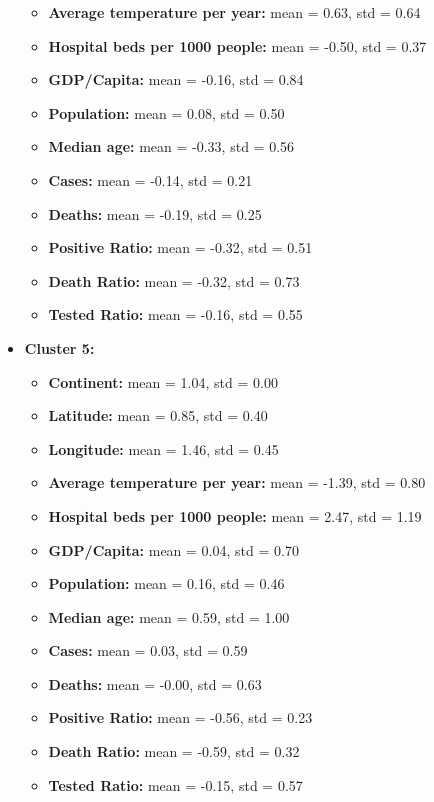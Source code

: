\documentclass[12pt,a4paper]{article}
\begin{document}
\begin{itemize}
\begin{itemize}
            \item \textbf{Average temperature per year:} mean = 0.63, std = 0.64
            \item \textbf{Hospital beds per 1000 people:} mean = -0.50, std = 0.37
            \item \textbf{GDP/Capita:} mean = -0.16, std = 0.84
            \item \textbf{Population:} mean = 0.08, std = 0.50
            \item \textbf{Median age:} mean = -0.33, std = 0.56
            \item \textbf{Cases:} mean = -0.14, std = 0.21
            \item \textbf{Deaths:} mean = -0.19, std = 0.25
            \item \textbf{Positive Ratio:} mean = -0.32, std = 0.51
            \item \textbf{Death Ratio:} mean = -0.32, std = 0.73
            \item \textbf{Tested Ratio:} mean = -0.16, std = 0.55
        \end{itemize}
    \item \textbf{Cluster 5:} 
        \begin{itemize}
            \item \textbf{Continent:} mean = 1.04, std = 0.00
            \item \textbf{Latitude:} mean = 0.85, std = 0.40
            \item \textbf{Longitude:} mean = 1.46, std = 0.45
            \item \textbf{Average temperature per year:} mean = -1.39, std = 0.80
            \item \textbf{Hospital beds per 1000 people:} mean = 2.47, std = 1.19
            \item \textbf{GDP/Capita:} mean = 0.04, std = 0.70
            \item \textbf{Population:} mean = 0.16, std = 0.46
            \item \textbf{Median age:} mean = 0.59, std = 1.00
            \item \textbf{Cases:} mean = 0.03, std = 0.59
            \item \textbf{Deaths:} mean = -0.00, std = 0.63
            \item \textbf{Positive Ratio:} mean = -0.56, std = 0.23
            \item \textbf{Death Ratio:} mean = -0.59, std = 0.32
            \item \textbf{Tested Ratio:} mean = -0.15, std = 0.57

\end{itemize}
\end{itemize}
\end{document}
